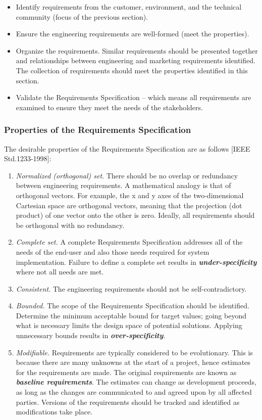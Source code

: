 \begin{itemize}
\item
  Identify requirements from the customer, environment, and the
  technical community (focus of the previous section).
\item
  Ensure the engineering requirements are well-formed (meet the
  properties).
\item
  Organize the requirements. Similar requirements should be presented
  together and relationships between engineering and marketing
  requirements identified. The collection of requirements should meet
  the properties identified in this section.
\item
  Validate the Requirements Specification -- which means all
  requirements are examined to ensure they meet the needs of the
  stakeholders.
\end{itemize}

\subsubsection{Properties of the Requirements
Specification}\label{properties-of-the-requirements-specification}

The desirable properties of the Requirements Specification are as
follows {[}IEEE Std.1233-1998{]}:

\begin{enumerate}
\def\labelenumi{\arabic{enumi})}
\item
  \emph{Normalized (orthogonal) set}. There should be no overlap or
  redundancy between engineering requirements. A mathematical analogy is
  that of orthogonal vectors. For example, the x and y axes of the
  two-dimensional Cartesian space are orthogonal vectors, meaning that
  the projection (dot product) of one vector onto the other is zero.
  Ideally, all requirements should be orthogonal with no redundancy.
\item
  \emph{Complete set.} A complete Requirements Specification addresses
  all of the needs of the end-user and also those needs required for
  system implementation. Failure to define a complete set results in
  \emph{\textbf{under-specificity}} where not all needs are met.
\item
  \emph{Consistent}. The engineering requirements should not be
  self-contradictory.
\item
  \emph{Bounded.} The scope of the Requirements Specification should be
  identified. Determine the minimum acceptable bound for target values;
  going beyond what is necessary limits the design space of potential
  solutions. Applying unnecessary bounds results in
  \emph{\textbf{over-specificity}}.
\item
  \emph{Modifiable.} Requirements are typically considered to be
  evolutionary. This is because there are many unknowns at the start of
  a project, hence estimates for the requirements are made. The original
  requirements are known as \emph{\textbf{baseline requirements}}. The
  estimates can change as development proceeds, as long as the changes
  are communicated to and agreed upon by all affected parties. Versions
  of the requirements should be tracked and identified as modifications
  take place.
\end{enumerate}

